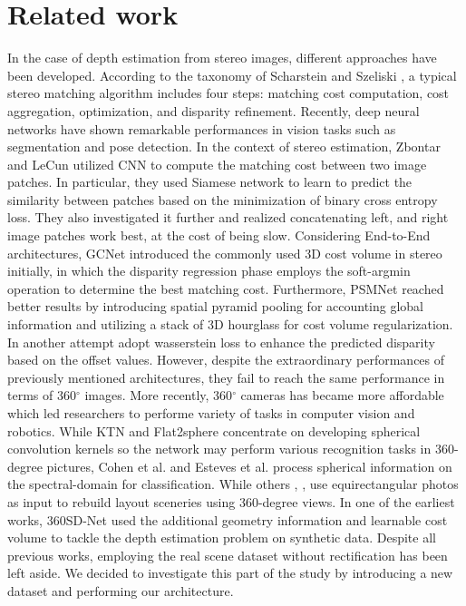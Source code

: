 \documentclass[english, LaM, oneside]{sapthesis}%
\begin{document}
\section{Related work}
In the case of depth estimation from stereo images, different approaches have been developed. According to the taxonomy of Scharstein and Szeliski \cite{c1}, a typical stereo matching algorithm includes four steps: matching cost computation, cost aggregation, optimization, and disparity refinement. 
Recently, deep neural networks have shown remarkable performances in vision tasks such as segmentation and pose detection. In the context of stereo estimation, Zbontar and LeCun \cite{c12} utilized CNN to compute the matching cost between two image patches. In particular, they used Siamese network to learn to predict the similarity between patches based on the minimization of binary cross entropy loss. \cite{c13} They also investigated it further and realized concatenating left, and right image patches work best, at the cost of being slow. 
Considering End-to-End architectures, GCNet \cite{c15} introduced the commonly used 3D cost volume in stereo initially, in which the disparity regression phase employs the soft-argmin operation to determine the best matching cost. Furthermore, PSMNet\cite{c16} reached better results by introducing spatial pyramid pooling for accounting global information and utilizing a stack of 3D hourglass for cost volume regularization. In another attempt \cite{c25} adopt wasserstein loss to enhance the predicted disparity based on the offset values. However, despite the extraordinary performances of previously mentioned architectures, they fail to reach the same performance in terms of 360$^\circ$ images. 
More recently, 360$^\circ$ cameras has became more affordable which led researchers to performe variety of tasks in computer vision and robotics. While KTN \cite{c18} and Flat2sphere \cite{c19} concentrate on developing spherical convolution kernels so the network may perform various recognition tasks in 360-degree pictures, Cohen et al. \cite{c16} and Esteves et al. \cite{ref:Binocular spherical} process spherical information on the spectral-domain for classification. While others \cite{c20}, \cite{c21} ,\cite{c22} use equirectangular photos as input to rebuild layout sceneries using 360-degree views. In one of the earliest works, 360SD-Net \cite{c20} used the additional geometry information and learnable cost volume to tackle the depth estimation problem on synthetic data. 
Despite all previous works, employing the real scene dataset without rectification has been left aside. We decided to investigate this part of the study by introducing a new dataset and performing our architecture. 
\end{document}
